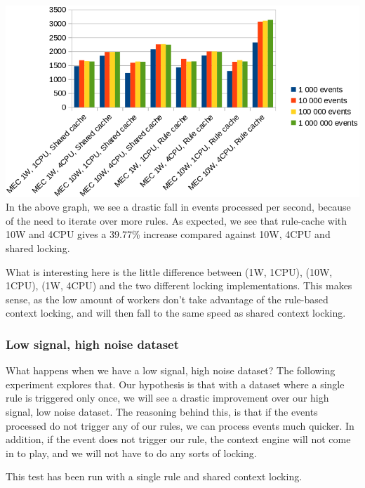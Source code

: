 \includegraphics[scale=0.525]{figures/new-rule-format/performance-2.png}
\\
In the above graph, we see a drastic fall in events processed per second, because of the need to iterate over more rules. As expected, we see that rule-cache with 10W and 4CPU gives a 39.77\% increase compared against 10W, 4CPU and shared locking.

What is interesting here is the little difference between (1W, 1CPU), (10W, 1CPU), (1W, 4CPU) and the two different locking implementations. This makes sense, as the low amount of workers don't take advantage of the rule-based context locking, and will then fall to the same speed as shared context locking.

\subsubsection{Low signal, high noise dataset}


What happens when we have a low signal, high noise dataset? The following experiment explores that. Our hypothesis is that with a dataset where a single rule is triggered only once, we will see a drastic improvement over our high signal, low noise dataset. The reasoning behind this, is that if the events processed do not trigger any of our rules, we can process events much quicker. In addition, if the event does not trigger our rule, the context engine will not come in to play, and we will not have to do any sorts of locking.

This test has been run with a single rule and shared context locking. 


